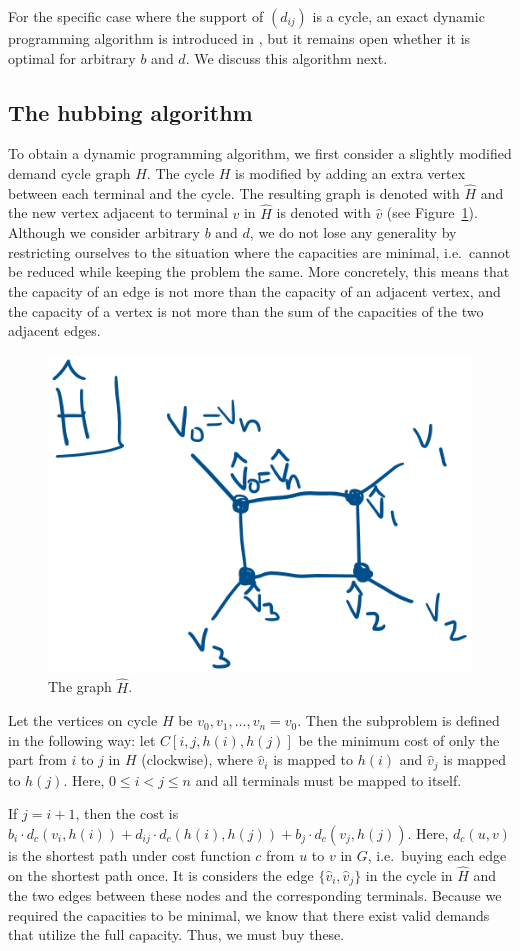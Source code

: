 For the specific case where the support of $(d_{ij})$ is a cycle, an exact dynamic programming algorithm is introduced in \cite{bosman2017exploring}, but it remains open whether it is optimal for arbitrary $b$ and $d$.
We discuss this algorithm next.

\subsection{The hubbing algorithm}
To obtain a dynamic programming algorithm, we first consider a slightly modified demand cycle graph $H$.
The cycle $H$ is modified by adding an extra vertex between each terminal and the cycle.
The resulting graph is denoted with $\hat H$ and the new vertex adjacent to terminal $v$ in $\hat H$ is denoted with $\hat v$ (see Figure~\ref{fig:hdak}).
Although we consider arbitrary $b$ and $d$, we do not lose any generality by restricting ourselves to the situation where the capacities are minimal, i.e.\ cannot be reduced while keeping the problem the same.
More concretely, this means that the capacity of an edge is not more than the capacity of an adjacent vertex, and the capacity of a vertex is not more than the sum of the capacities of the two adjacent edges.

\begin{figure}
    \centering
    \includegraphics[width=.35\textwidth]{hdak.png}
    \caption{The graph $\hat H$.} \label{fig:hdak}
\end{figure}

Let the vertices on cycle $H$ be $v_0, v_1, \dots, v_n = v_0$.
Then the subproblem is defined in the following way: let $C[i, j, h(i), h(j)]$ be the minimum cost of only the part from $i$ to $j$ in $H$ (clockwise), where $\hat v_i$ is mapped to $h(i)$ and $\hat v_j$ is mapped to $h(j)$.
Here, $0 \le i < j \le n$ and all terminals must be mapped to itself.

If $j = i + 1$, then the cost is $b_i \cdot d_c(v_i, h(i)) + d_{ij} \cdot d_c(h(i), h(j)) + b_j \cdot d_c(v_j, h(j))$.
Here, $d_c(u, v)$ is the shortest path under cost function $c$ from $u$ to $v$ in $G$, i.e.\ buying each edge on the shortest path once.
It is considers the edge $\{\hat v_i, \hat v_j\}$ in the cycle in $\hat H$ and the two edges between these nodes and the corresponding terminals.
Because we required the capacities to be minimal, we know that there exist valid demands that utilize the full capacity.
Thus, we must buy these.

